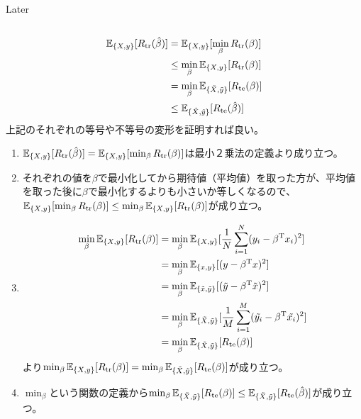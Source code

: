 \documentclass{jsarticle}
\begin{document}
\subsection{}
Later

\subsection{}
\begin{align*}
\mathbb{E}_{\{X,y\}}[R_{\rm tr}(\hat{\beta})]&=\mathbb{E}_{\{X,y\}}[\min_{\beta}R_{\rm tr}(\beta)]\\
&\leq\min_{\beta}\mathbb{E}_{\{X,y\}}[R_{\rm tr}(\beta)]\\
&=\min_{\beta}\mathbb{E}_{\{\tilde{X},\tilde{y}\}}[R_{\rm te}(\beta)]\\
&\leq \mathbb{E}_{\{\tilde{X},\tilde{y}\}}[R_{\rm te}(\hat{\beta})]
\end{align*}
上記のそれぞれの等号や不等号の変形を証明すれば良い。\\
\begin{enumerate}
\item
$\mathbb{E}_{\{X,y\}}[R_{\rm tr}(\hat{\beta})]=\mathbb{E}_{\{X,y\}}[\min_{\beta}R_{\rm tr}(\beta)]$は最小２乗法の定義より成り立つ。
\item
それぞれの値を$\beta$で最小化してから期待値（平均値）を取った方が、平均値を取った後に$\beta$で最小化するよりも小さいか等しくなるので、$\mathbb{E}_{\{X,y\}}[\min_{\beta}R_{\rm tr}(\beta)]\leq\min_{\beta}\mathbb{E}_{\{X,y\}}[R_{\rm tr}(\beta)]$が成り立つ。
\item
\begin{align*}
\min_{\beta}\mathbb{E}_{\{X,y\}}[R_{\rm tr}(\beta)]&=
\min_{\beta}\mathbb{E}_{\{X,y\}}[\frac{1}{N}\sum_{i=1}^{N}(y_i-\beta^{\mathrm{T}}x_i)^2]\\
&=\min_{\beta}\mathbb{E}_{\{x,y\}}[(y-\beta^{\mathrm{T}}x)^2]\\
&=\min_{\beta}\mathbb{E}_{\{\tilde{x},\tilde{y}\}}[(\tilde{y}-\beta^{\mathrm{T}}\tilde{x})^2]\\
&=\min_{\beta}\mathbb{E}_{\{\tilde{X},\tilde{y}\}}[\frac{1}{M}\sum_{i=1}^{M}(\tilde{y_i}-\beta^{\mathrm{T}}\tilde{x_i})^2]\\
&=\min_{\beta}\mathbb{E}_{\{\tilde{X},\tilde{y}\}}[R_{\rm te}(\beta)]
\end{align*}
より$\min_{\beta}\mathbb{E}_{\{X,y\}}[R_{\rm tr}(\beta)]=\min_{\beta}\mathbb{E}_{\{\tilde{X},\tilde{y}\}}[R_{\rm te}(\beta)]$が成り立つ。
\item
$\min_{\beta}$という関数の定義から$\min_{\beta}\mathbb{E}_{\{\tilde{X},\tilde{y}\}}[R_{\rm te}(\beta)]\leq \mathbb{E}_{\{\tilde{X},\tilde{y}\}}[R_{\rm te}(\hat{\beta})]$が成り立つ。
\end{enumerate}
\end{document}
